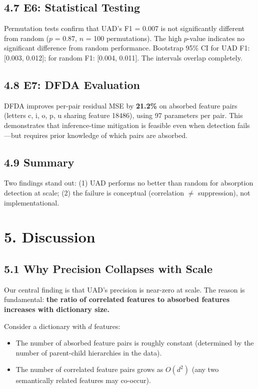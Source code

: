 \documentclass{article}
\begin{document}
\subsection{4.7 E6: Statistical Testing}

Permutation tests confirm that UAD's F1 = 0.007 is not significantly different from random ($p$ = 0.87, $n$ = 100 permutations). The high $p$-value indicates no significant difference from random performance. Bootstrap 95\% CI for UAD F1: [0.003, 0.012]; for random F1: [0.004, 0.011]. The intervals overlap completely.

\subsection{4.8 E7: DFDA Evaluation}

DFDA improves per-pair residual MSE by \textbf{21.2\%} on absorbed feature pairs (letters c, i, o, p, u sharing feature 18486), using 97 parameters per pair. This demonstrates that inference-time mitigation is feasible even when detection fails---but requires prior knowledge of which pairs are absorbed.

\subsection{4.9 Summary}

Two findings stand out: (1) UAD performs no better than random for absorption detection at scale; (2) the failure is conceptual (correlation $\neq$ suppression), not implementational.


\section{5. Discussion}

\subsection{5.1 Why Precision Collapses with Scale}

Our central finding is that UAD's precision is near-zero at scale. The reason is fundamental: \textbf{the ratio of correlated features to absorbed features increases with dictionary size.}

Consider a dictionary with $d$ features:
\begin{itemize}
  \item The number of absorbed feature pairs is roughly constant (determined by the number of parent-child hierarchies in the data).
  \item The number of correlated feature pairs grows as $O(d^2)$ (any two semantically related features may co-occur).
\end{itemize}
\end{document}

